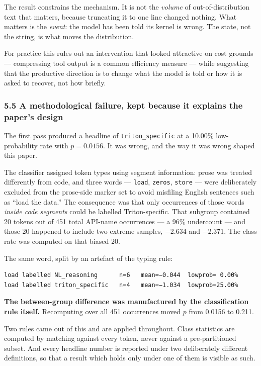 \documentclass[
  11pt,
]{article}
\begin{document}
The result constrains the mechanism. It is not the \emph{volume} of
out-of-distribution text that matters, because truncating it to one line
changed nothing. What matters is the \emph{event}: the model has been
told its kernel is wrong. The state, not the string, is what moves the
distribution.

For practice this rules out an intervention that looked attractive on
cost grounds --- compressing tool output is a common efficiency measure
--- while suggesting that the productive direction is to change what the
model is told or how it is asked to recover, not how briefly.

\hypertarget{a-methodological-failure-kept-because-it-explains-the-papers-design}{%
\subsubsection{5.5 A methodological failure, kept because it explains
the paper's
design}\label{a-methodological-failure-kept-because-it-explains-the-papers-design}}

The first pass produced a headline of \texttt{triton\_specific} at a
10.00\% low-probability rate with \(p = 0.0156\). It was wrong, and the
way it was wrong shaped this paper.

The classifier assigned token types using segment information: prose was
treated differently from code, and three words --- \texttt{load},
\texttt{zeros}, \texttt{store} --- were deliberately excluded from the
prose-side marker set to avoid misfiling English sentences such as
``load the data.'' The consequence was that only occurrences of those
words \emph{inside code segments} could be labelled Triton-specific.
That subgroup contained 20 tokens out of 451 total API-name occurrences
--- a 96\% undercount --- and those 20 happened to include two extreme
samples, −2.634 and −2.371. The class rate was computed on that biased
20.

The same word, split by an artefact of the typing rule:

\begin{verbatim}
load labelled NL_reasoning      n=6   mean=−0.044  lowprob= 0.00%
load labelled triton_specific   n=4   mean=−1.034  lowprob=25.00%
\end{verbatim}

\textbf{The between-group difference was manufactured by the
classification rule itself.} Recomputing over all 451 occurrences moved
\(p\) from 0.0156 to 0.211.

Two rules came out of this and are applied throughout. Class statistics
are computed by matching against every token, never against a
pre-partitioned subset. And every headline number is reported under two
deliberately different definitions, so that a result which holds only
under one of them is visible as such.
\end{document}
